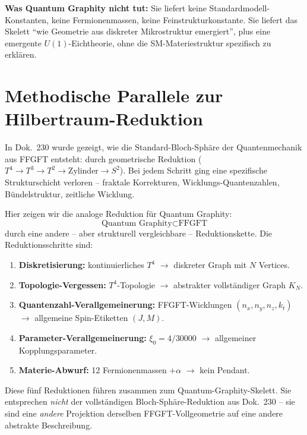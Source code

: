 \textbf{Was Quantum Graphity nicht tut:} Sie liefert keine
Standardmodell-Konstanten, keine Fermionenmassen, keine
Feinstrukturkonstante. Sie liefert das Skelett \enquote{wie
Geometrie aus diskreter Mikrostruktur emergiert}, plus eine
emergente $U(1)$-Eichtheorie, ohne die SM-Materiestruktur
spezifisch zu erklären.

\section{Methodische Parallele zur Hilbertraum-Reduktion}

In Dok.~230 wurde gezeigt, wie die Standard-Bloch-Sphäre der
Quantenmechanik aus FFGFT entsteht: durch geometrische Reduktion
($T^4 \to T^3 \to T^2 \to \text{Zylinder} \to S^2$). Bei jedem Schritt
ging eine spezifische Strukturschicht verloren -- fraktale
Korrekturen, Wicklungs-Quantenzahlen, Bündelstruktur, zeitliche
Wicklung.

Hier zeigen wir die analoge Reduktion für Quantum Graphity:
\begin{equation}
  \boxed{\text{Quantum Graphity} \subset \text{FFGFT}}
\end{equation}
durch eine andere -- aber strukturell vergleichbare --
Reduktionskette. Die Reduktionsschritte sind:
\begin{enumerate}[leftmargin=2em,itemsep=2pt,topsep=2pt]
  \item \textbf{Diskretisierung:} kontinuierliches $T^4$ $\to$
        diskreter Graph mit $N$ Vertices.
  \item \textbf{Topologie-Vergessen:} $T^4$-Topologie $\to$
        abstrakter vollständiger Graph $K_N$.
  \item \textbf{Quantenzahl-Verallgemeinerung:} FFGFT-Wicklungen
        $(n_x, n_y, n_z, k_t)$ $\to$ allgemeine Spin-Etiketten
        $(J, M)$.
  \item \textbf{Parameter-Verallgemeinerung:} $\xi_0 = 4/30000$
        $\to$ allgemeiner Kopplungsparameter.
  \item \textbf{Materie-Abwurf:} 12 Fermionenmassen $+ \alpha$
        $\to$ kein Pendant.
\end{enumerate}

Diese fünf Reduktionen führen zusammen zum Quantum-Graphity-Skelett.
Sie entsprechen \emph{nicht} der vollständigen Bloch-Sphäre-Reduktion
aus Dok.~230 -- sie sind eine \emph{andere} Projektion derselben
FFGFT-Vollgeometrie auf eine andere abstrakte Beschreibung.

